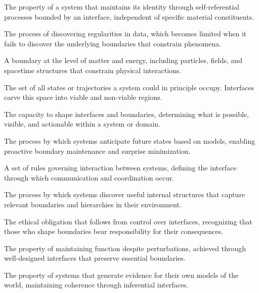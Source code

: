 \documentclass[
  openright]{book}
\renewenvironment{description}
  {\list{}{\labelwidth 0pt \itemindent-\leftmargin \leftmargin 2.5em
          \itemsep 0.4\baselineskip
          \parsep 0pt
          \let\makelabel\descriptionlabel}}
  {\endlist}
\newcommand*\descriptionlabel[1]{\hspace\labelsep\normalfont\bfseries #1}
\begin{document}
\begin{description}
\item[Operational Closure] The property of a system that maintains its identity through self-referential processes bounded by an interface, independent of specific material constituents.

\item[Pattern Learning] The process of discovering regularities in data, which becomes limited when it fails to discover the underlying boundaries that constrain phenomena.

\item[Physical Interface] A boundary at the level of matter and energy, including particles, fields, and spacetime structures that constrain physical interactions.

\item[Possibility Space] The set of all states or trajectories a system could in principle occupy. Interfaces carve this space into viable and non-viable regions.

\item[Power] The capacity to shape interfaces and boundaries, determining what is possible, visible, and actionable within a system or domain.

\item[Prediction] The process by which systems anticipate future states based on models, enabling proactive boundary maintenance and surprise minimization.

\item[Protocol] A set of rules governing interaction between systems, defining the interface through which communication and coordination occur.

\item[Representation Learning] The process by which systems discover useful internal structures that capture relevant boundaries and hierarchies in their environment.

\item[Responsibility] The ethical obligation that follows from control over interfaces, recognizing that those who shape boundaries bear responsibility for their consequences.

\item[Robustness] The property of maintaining function despite perturbations, achieved through well-designed interfaces that preserve essential boundaries.

\item[Self-Evidencing] The property of systems that generate evidence for their own models of the world, maintaining coherence through inferential interfaces.


\end{description}
\end{document}
